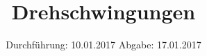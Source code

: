 

\subject{V 102}
\title{Drehschwingungen}
\date{
\centering
  Durchführung: 10.01.2017
  \hspace{3em}
  Abgabe: 17.01.2017
}



\maketitle
\thispagestyle{empty}
\tableofcontents
\newpage








\printbibliography



